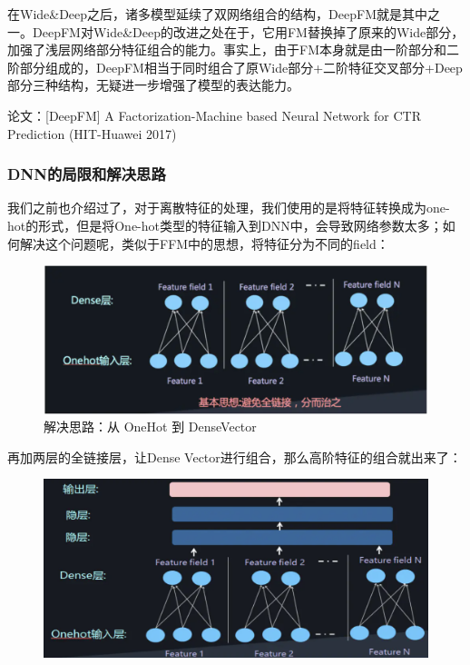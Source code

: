 \documentclass[12pt]{article}
\begin{document}
在Wide\&Deep之后，诸多模型延续了双网络组合的结构，DeepFM就是其中之一。DeepFM对Wide\&Deep的改进之处在于，它用FM替换掉了原来的Wide部分，加强了浅层网络部分特征组合的能力。事实上，由于FM本身就是由一阶部分和二阶部分组成的，DeepFM相当于同时组合了原Wide部分+二阶特征交叉部分+Deep部分三种结构，无疑进一步增强了模型的表达能力。

论文：[DeepFM] A Factorization-Machine based Neural Network for CTR Prediction (HIT-Huawei 2017)

\subsubsection{DNN的局限和解决思路\cite{Recommender_System_With_Deep_Learning_DeepFM}}
我们之前也介绍过了，对于离散特征的处理，我们使用的是将特征转换成为one-hot的形式，但是将One-hot类型的特征输入到DNN中，会导致网络参数太多；如何解决这个问题呢，类似于FFM中的思想，将特征分为不同的field：
\begin{figure}[H]
    \centering
    \includegraphics[width=.8\textwidth]{fig/Deep_FM_From_One_Hot_To_Dense_Vector.png}
    \caption*{解决思路：从 OneHot 到 DenseVector}
\end{figure}

再加两层的全链接层，让Dense Vector进行组合，那么高阶特征的组合就出来了：
\begin{figure}[H]
    \centering
    \includegraphics[width=.8\textwidth]{fig/Deep_FM_From_One_Hot_To_Dense_Vector_Add_MLP.png}
\end{figure}
\end{document}
